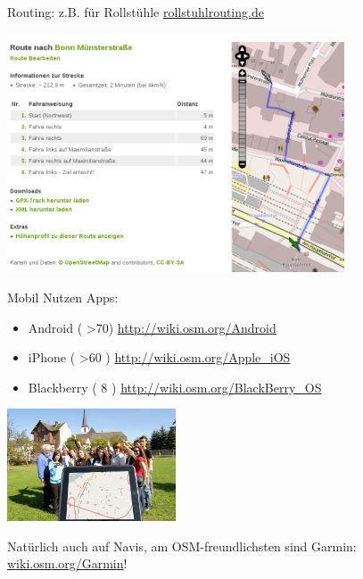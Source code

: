 \documentclass{beamer}
\begin{document}
\hypersetup{urlcolor=cyan}
\begin{frame}{Routing: z.B. für Rollstühle \hfill\href{http://rollstuhlrouting.de}{rollstuhlrouting.de}}

	\includegraphics[width=10cm]{wheelchair-router.png}

\end{frame}
\hypersetup{urlcolor=blue}


\begin{frame}{Mobil Nutzen}
	Apps:
 
 \begin{itemize}
   \item  Android ( \textgreater 70) \url{http://wiki.osm.org/Android}
   \item  iPhone ( \textgreater 60 )  \url{http://wiki.osm.org/Apple\_iOS}
   \item  Blackberry ( 8 ) \url{http://wiki.osm.org/BlackBerry\_OS}
 \end{itemize}
 
 \begin{center}
 \includegraphics[width=5cm]{tablet.jpg}
 \end{center}

 Natürlich auch auf Navis, am OSM-freundlichsten sind Garmin: \href{http://wiki.osm.org/Garmin}{wiki.osm.org/Garmin}!

\end{frame}
\end{document}
